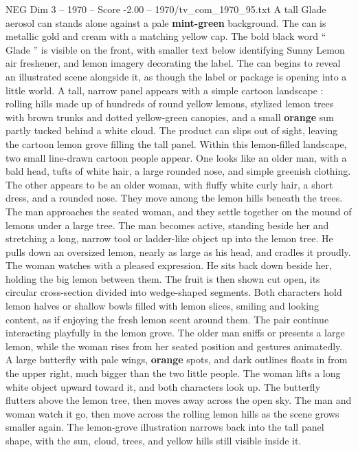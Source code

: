 \begin{textsample}{NEG Dim 3 – 1970 – Score -2.00 – 1970/tv\_com\_1970\_95.txt}  \label{ex:f3_neg_064}
A tall Glade aerosol can stands alone against a pale \textbf{mint-green} background.
The can is metallic gold and cream with a matching yellow cap.
The bold black word “ Glade ” is visible on the front, with smaller text below identifying Sunny Lemon air freshener, and lemon imagery decorating the label.
The can begins to reveal an illustrated scene alongside it, as though the label or package is opening into a little world.
A tall, narrow panel appears with a simple cartoon landscape : rolling hills made up of hundreds of round yellow lemons, stylized lemon trees with brown trunks and dotted yellow-green canopies, and a small \textbf{orange} sun partly tucked behind a white cloud.
The product can slips out of sight, leaving the cartoon lemon grove filling the tall panel.
Within this lemon-filled landscape, two small line-drawn cartoon people appear.
One looks like an older man, with a bald head, tufts of white hair, a large rounded nose, and simple greenish clothing.
The other appears to be an older woman, with fluffy white curly hair, a short dress, and a rounded nose.
They move among the lemon hills beneath the trees.
The man approaches the seated woman, and they settle together on the mound of lemons under a large tree.
The man becomes active, standing beside her and stretching a long, narrow tool or ladder-like object up into the lemon tree.
He pulls down an oversized lemon, nearly as large as his head, and cradles it proudly.
The woman watches with a pleased expression.
He sits back down beside her, holding the big lemon between them.
The fruit is then shown cut open, its circular cross-section divided into wedge-shaped segments.
Both characters hold lemon halves or shallow bowls filled with lemon slices, smiling and looking content, as if enjoying the fresh lemon scent around them.
The pair continue interacting playfully in the lemon grove.
The older man sniffs or presents a large lemon, while the woman rises from her seated position and gestures animatedly.
A large butterfly with pale wings, \textbf{orange} spots, and dark outlines floats in from the upper right, much bigger than the two little people.
The woman lifts a long white object upward toward it, and both characters look up.
The butterfly flutters above the lemon tree, then moves away across the open sky.
The man and woman watch it go, then move across the rolling lemon hills as the scene grows smaller again.
The lemon-grove illustration narrows back into the tall panel shape, with the sun, cloud, trees, and yellow hills still visible inside it.

\end{textsample}
